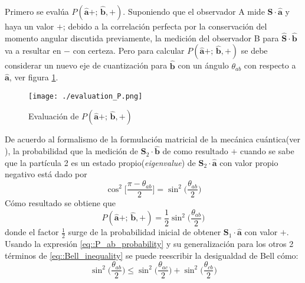 \documentclass[a4paper]{article}
\begin{document}
Primero se evalúa $P(\mathbf{\hat{a}}+;\, \mathbf{\hat{b}},+)$. Suponiendo que el observador A mide $\mathbf{\hat{S}} \cdot \mathbf{\hat{a}}$ y haya un valor $+$; debido a la correlación perfecta por la conservación del momento angular discutida previamente, la medición del observador B para $\mathbf{\hat{S}} \cdot \mathbf{\hat{b}}$ va a resultar en $-$ con certeza. Pero para calcular $P(\mathbf{\hat{a}}+;\, \mathbf{\hat{b}},+)$ se debe considerar un nuevo eje de cuantización para $\mathbf{\hat{b}}$ con un ángulo $\theta_{ab}$ con respecto a $\mathbf{\hat{a}}$, ver figura \ref{fig::P_evaluation}. 
\begin{figure}[h]
\begin{center}
\texttt{[image: ./evaluation\_P.png]} 
\end{center} 
\caption{Evaluación de $P(\mathbf{\hat{a}}+;\, \mathbf{\hat{b}},+)$}
\label{fig::P_evaluation}
\end{figure}
De acuerdo al formalismo de la formulación matricial de la mecánica cuántica(ver \cite{Sakurai}), la probabilidad que la medición de $\mathbf{S}_2\cdot \mathbf{\hat{b}}$ de como resultado $+$ cuando se sabe que la partícula 2 es un estado propio(\textit{eigenvalue}) de $\mathbf{S}_2\cdot \mathbf{\hat{a}}$ con valor propio negativo está dado por
\begin{equation}
\cos^2\Bigg[\frac{\pi-\theta_{ab}}{2}\Bigg]=\sin^2\bigg(\frac{\theta_{ab}}{2}\bigg)
\end{equation}
Cómo resultado se obtiene que 
\begin{equation}\label{eq::P_ab_probability}
P(\mathbf{\hat{a}}+;\, \mathbf{\hat{b}},+)=\frac{1}{2}\sin^2\bigg(\frac{\theta_{ab}}{2}\bigg)
\end{equation}
donde el factor $\frac{1}{2}$ surge de la probabilidad inicial de obtener $\mathbf{S}_1\cdot \mathbf{\hat{a}}$ con valor $+$. Usando la expresión \ref{eq::P_ab_probability} y su generalización para los otros 2 términos de \ref{eq::Bell_inequality} se puede reescribir la desigualdad de Bell cómo:
\begin{equation}\label{eq::Bell_inequality_2}
\sin^2\bigg(\frac{\theta_{ab}}{2}\bigg)\leq \sin^2\bigg(\frac{\theta_{ac}}{2}\bigg)+\sin^2\bigg(\frac{\theta_{cb}}{2}\bigg)
\end{equation}
\end{document}
